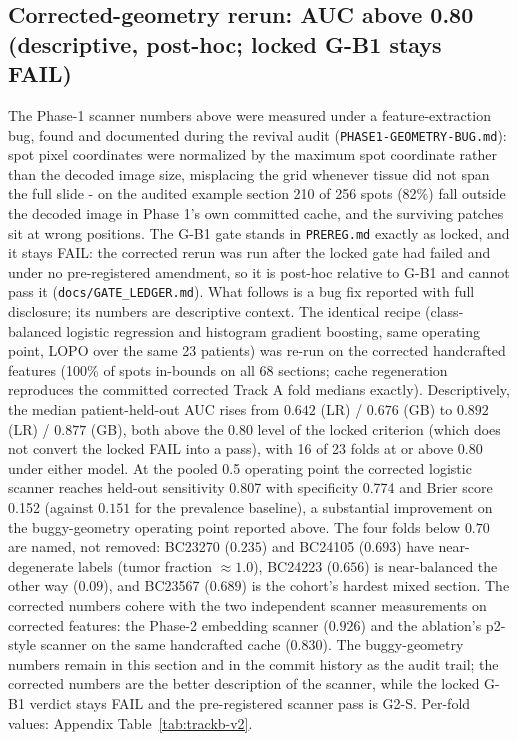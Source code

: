 \documentclass[11pt]{article}
\begin{document}
\subsection{Corrected-geometry rerun: AUC above 0.80 (descriptive, post-hoc; locked G-B1 stays FAIL)}
\label{sec:trackb-v2}
The Phase-1 scanner numbers above were measured under a feature-extraction
bug, found and documented during the revival audit
(\texttt{PHASE1-GEOMETRY-BUG.md}): spot pixel coordinates were normalized
by the maximum spot coordinate rather than the decoded image size,
misplacing the grid whenever tissue did not span the full slide - on the
audited example section 210 of 256 spots (82\%) fall outside the decoded
image in Phase 1's own committed cache, and the surviving patches sit at
wrong positions. The G-B1 gate stands in \texttt{PREREG.md} exactly as
locked, and it stays FAIL: the corrected rerun was run after the locked gate had failed and under no pre-registered amendment, so it is post-hoc relative to G-B1 and cannot pass it (\texttt{docs/GATE\_LEDGER.md}). What follows is a bug fix reported with full disclosure; its numbers are descriptive context.
The identical recipe (class-balanced logistic regression and histogram
gradient boosting, same operating point, LOPO over the same 23 patients) was
re-run on the corrected handcrafted features (100\% of spots in-bounds on
all 68 sections; cache regeneration reproduces the committed corrected
Track A fold medians exactly). Descriptively, the median patient-held-out AUC
rises from $0.642$ (LR) / $0.676$ (GB) to $\mathbf{0.892}$ (LR) /
$\mathbf{0.877}$ (GB), both above the $0.80$ level of the locked criterion (which does not convert the locked FAIL into a pass), with
16 of 23 folds at or above $0.80$ under either model. At the pooled 0.5
operating point the corrected logistic scanner reaches held-out sensitivity
0.807 with specificity 0.774 and Brier score 0.152 (against $0.151$ for the
prevalence baseline), a substantial improvement on the buggy-geometry
operating point reported above. The four folds below
$0.70$ are named, not removed: BC23270 ($0.235$) and BC24105 ($0.693$) have
near-degenerate labels (tumor fraction $\approx 1.0$), BC24223 ($0.656$) is
near-balanced the other way ($0.09$), and BC23567 ($0.689$) is the cohort's
hardest mixed section. The corrected numbers cohere with the two
independent scanner measurements on corrected features: the Phase-2
embedding scanner ($0.926$) and the ablation's p2-style scanner on the same
handcrafted cache ($0.830$). The buggy-geometry numbers remain in this
section and in the commit history as the audit trail; the corrected numbers
are the better description of the scanner, while the locked G-B1 verdict stays FAIL and the pre-registered scanner pass is G2-S. Per-fold values: Appendix
Table~\ref{tab:trackb-v2}.
\end{document}
